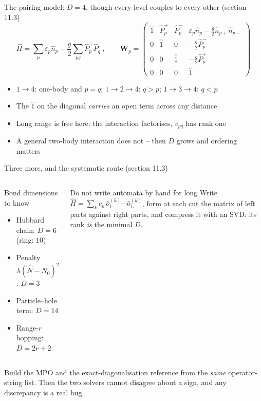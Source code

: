 \documentclass[aspectratio=169,10pt]{beamer}
\newcommand{\warnbox}[1]{%
  \begin{tcolorbox}[colback=palewarm,colframe=warm,title={\bfseries A trap to avoid}]
  #1
  \end{tcolorbox}}
\newcommand{\bmat}[1]{\bm{#1}}
\newcommand{\hH}{\hat{H}}
\begin{document}
\begin{frame}{The pairing model: $D=4$, though every level couples to every other (section 11.3)}
  \[
    \hH=\sum_p\varepsilon_p\hat n_p-\frac g2\sum_{pq}\hat P^+_p\hat P^-_q,
    \qquad
    \bmat W_p=\begin{pmatrix}
      \hat1 & \hat P^+_p & \hat P^-_p & \varepsilon_p\hat n_p-\frac g2\hat n_{p+}\hat n_{p-}\\
      0&\hat1&0&-\frac g2\hat P^-_p\\
      0&0&\hat1&-\frac g2\hat P^+_p\\
      0&0&0&\hat1
    \end{pmatrix}
  \]
  \begin{itemize}
    \item $1\to4$: one-body and $p=q$; \quad $1\to2\to4$: $q>p$; \quad $1\to3\to4$: $q<p$
    \item The $\hat1$ on the diagonal \emph{carries} an open term across any distance
    \item \alert{Long range is free here}: the interaction factorises, $v_{pq}$ has rank one
    \item A general two-body interaction does not -- then $D$ grows and ordering matters
  \end{itemize}
\end{frame}

\begin{frame}{Three more, and the systematic route (section 11.3)}
  \begin{columns}[T]
    \begin{block}{Bond dimensions to know}
      \begin{itemize}
        \item Hubbard chain: $D=6$ (ring: $10$)
        \item Penalty $\lambda(\hat N-N_0)^2$: $D=3$
        \item Particle--hole term: $D=14$
        \item Range-$r$ hopping: $D=2r+2$
      \end{itemize}
    \end{block}
    \begin{block}{Do not write automata by hand for long}
      Write $\hH=\sum_kc_k\,\hat o^{(k)}_1\cdots\hat o^{(k)}_L$, form at each cut the matrix of left parts against right parts, and compress it with an SVD: its rank \emph{is} the minimal $D$.
    \end{block}
  \end{columns}
  \vspace{0.5em}
  \warnbox{Build the MPO and the exact-diagonalisation reference from the \emph{same} operator-string list. Then the two solvers cannot disagree about a sign, and any discrepancy is a real bug.}
\end{frame}
\end{document}
